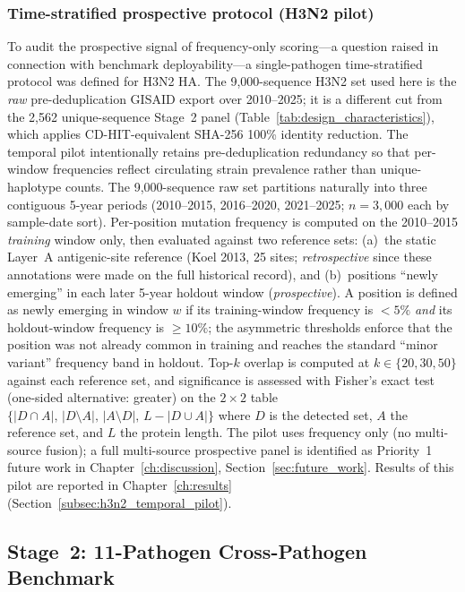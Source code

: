 \subsubsection{Time-stratified prospective protocol (H3N2 pilot)}
\label{subsubsec:h3n2_temporal_methods}

To audit the prospective signal of frequency-only scoring---a question raised in connection with benchmark deployability---a single-pathogen time-stratified protocol was defined for H3N2 HA. The 9{,}000-sequence H3N2 set used here is the \emph{raw} pre-deduplication GISAID export over 2010--2025; it is a different cut from the 2{,}562 unique-sequence Stage~2 panel (Table~\ref{tab:design_characteristics}), which applies CD-HIT-equivalent SHA-256 100\% identity reduction. The temporal pilot intentionally retains pre-deduplication redundancy so that per-window frequencies reflect circulating strain prevalence rather than unique-haplotype counts. The 9{,}000-sequence raw set partitions naturally into three contiguous 5-year periods (2010--2015, 2016--2020, 2021--2025; $n = 3{,}000$ each by sample-date sort). Per-position mutation frequency is computed on the 2010--2015 \emph{training} window only, then evaluated against two reference sets: (a)~the static Layer~A antigenic-site reference (Koel 2013, 25 sites; \emph{retrospective} since these annotations were made on the full historical record), and (b)~positions ``newly emerging'' in each later 5-year holdout window (\emph{prospective}). A position is defined as newly emerging in window $w$ if its training-window frequency is $< 5\%$ \emph{and} its holdout-window frequency is $\geq 10\%$; the asymmetric thresholds enforce that the position was not already common in training and reaches the standard ``minor variant'' frequency band in holdout. Top-$k$ overlap is computed at $k \in \{20, 30, 50\}$ against each reference set, and significance is assessed with Fisher's exact test (one-sided alternative: greater) on the $2 \times 2$ table $\{|D \cap A|,\,|D \setminus A|,\,|A \setminus D|,\,L - |D \cup A|\}$ where $D$ is the detected set, $A$ the reference set, and $L$ the protein length. The pilot uses frequency only (no multi-source fusion); a full multi-source prospective panel is identified as Priority~1 future work in Chapter~\ref{ch:discussion}, Section~\ref{sec:future_work}. Results of this pilot are reported in Chapter~\ref{ch:results} (Section~\ref{subsec:h3n2_temporal_pilot}).

\subsection{Stage~2: 11-Pathogen Cross-Pathogen Benchmark}
\label{sec:stage2}

